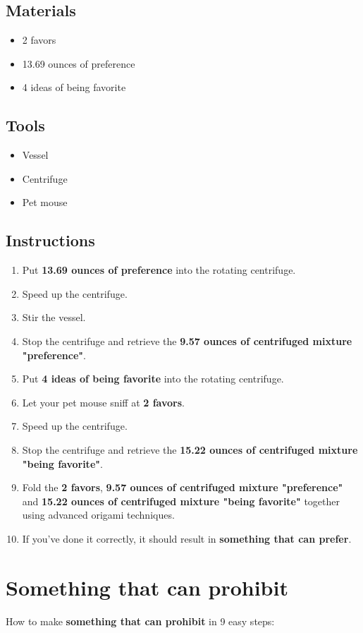 \documentclass{article}
\begin{document}
\subsection{Materials}\begin{itemize}
\item 
2 favors
\item 
13.69 ounces of preference
\item 
4 ideas of being favorite
\end{itemize}
\subsection{Tools}\begin{itemize}
\item 
Vessel
\item 
Centrifuge
\item 
Pet mouse
\end{itemize}
\subsection{Instructions}\begin{enumerate}
\item 
Put \textbf{13.69 ounces of preference} into the rotating centrifuge.
\item 
Speed up the centrifuge.
\item 
Stir the vessel.
\item 
Stop the centrifuge and retrieve the \textbf{9.57 ounces of centrifuged mixture "preference"}.
\item 
Put \textbf{4 ideas of being favorite} into the rotating centrifuge.
\item 
Let your pet mouse sniff at \textbf{2 favors}.
\item 
Speed up the centrifuge.
\item 
Stop the centrifuge and retrieve the \textbf{15.22 ounces of centrifuged mixture "being favorite"}.
\item 
Fold the \textbf{2 favors}, \textbf{9.57 ounces of centrifuged mixture "preference"} and \textbf{15.22 ounces of centrifuged mixture "being favorite"} together using advanced origami techniques.
\item 
If you've done it correctly, it should result in \textbf{something that can prefer}.
\end{enumerate}
\newpage
\section{Something that can prohibit}How to make \textbf{something that can prohibit} in 9 easy steps:
\end{document}
